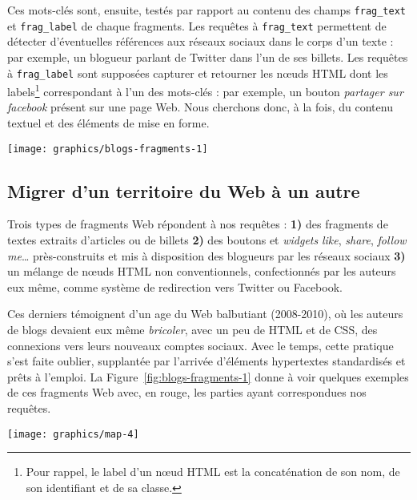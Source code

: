 \documentclass[symmetric,justified,marginals=raggedouter]{tufte-book}
\begin{document}
\noindent Ces mots-clés sont, ensuite, testés par rapport au contenu des champs \texttt{frag\_text} et \texttt{frag\_label} de chaque fragments. Les requêtes à \texttt{frag\_text} permettent de détecter d'éventuelles références aux réseaux sociaux dans le corps d'un texte : par exemple, un blogueur parlant de Twitter dans l'un de ses billets. Les requêtes à \texttt{frag\_label} sont supposées capturer et retourner les nœuds HTML dont les labels\footnote{\RaggedOuter Pour rappel, le label d'un nœud HTML est la concaténation de son nom, de son identifiant et de sa classe.} correspondant à l'un des mots-clés : par exemple, un bouton \textit{partager sur facebook} présent sur une page Web. Nous cherchons donc, à la fois, du contenu textuel et des éléments de mise en forme.

\begin{figure*}
  \texttt{[image: graphics/blogs-fragments-1]}
  \caption{Exemples de fragments Web associés à divers réseaux sociaux}
  \label{fig:blogs-fragments-1}
\end{figure*} 

\subsection{Migrer d'un territoire du Web à un autre}

\noindent Trois types de fragments Web répondent à nos requêtes : \textbf{1)} des fragments de textes extraits d'articles ou de billets \textbf{2)} des boutons et \textit{widgets} \textit{like}, \textit{share}, \textit{follow me}\ldots{} près-construits et mis à disposition des blogueurs par les réseaux sociaux \textbf{3)} un mélange de nœuds HTML non conventionnels, confectionnés par les auteurs eux même, comme système de redirection vers Twitter ou Facebook. 

Ces derniers témoignent d'un age du Web balbutiant (2008-2010), où les auteurs de blogs devaient eux même \textit{bricoler}, avec un peu de HTML et de CSS, des connexions vers leurs nouveaux comptes sociaux. Avec le temps, cette pratique s'est faite oublier, supplantée par l'arrivée d'éléments hypertextes standardisés et prêts à l'emploi. La Figure~\ref{fig:blogs-fragments-1} donne à voir quelques exemples de ces fragments Web avec, en rouge, les parties ayant correspondues nos requêtes. 

\begin{marginfigure}%
  \texttt{[image: graphics/map-4]}
  \vspace*{0.2cm}  
  \caption{\textit{eatbees.com} (rouge) dans l'e-Diaspora marocaine}
  \label{fig:eatbees-map}
\end{marginfigure} 
\end{document}
